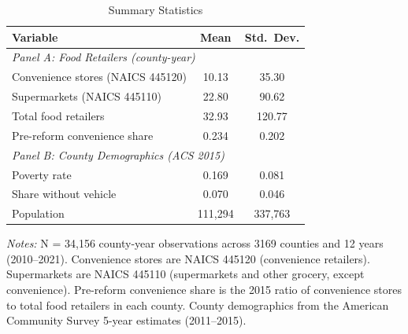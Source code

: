 
\begin{table}[H]
\centering
\caption{Summary Statistics}
\label{tab:summary}
\begin{threeparttable}
\begin{tabular}{lcc}
\toprule
Variable & Mean & Std.\ Dev. \\
\midrule
\multicolumn{3}{l}{\textit{Panel A: Food Retailers (county-year)}} \\[2pt]
Convenience stores (NAICS 445120) & 10.13 & 35.30 \\
Supermarkets (NAICS 445110) & 22.80 & 90.62 \\
Total food retailers & 32.93 & 120.77 \\
Pre-reform convenience share & 0.234 & 0.202 \\[4pt]
\multicolumn{3}{l}{\textit{Panel B: County Demographics (ACS 2015)}} \\[2pt]
Poverty rate & 0.169 & 0.081 \\
Share without vehicle & 0.070 & 0.046 \\
Population & 111,294 & 337,763 \\
\bottomrule
\end{tabular}
\begin{tablenotes}[flushleft]
\small
\item \textit{Notes:} N = 34,156 county-year observations across 3169 counties and 12 years (2010--2021). Convenience stores are NAICS 445120 (convenience retailers). Supermarkets are NAICS 445110 (supermarkets and other grocery, except convenience). Pre-reform convenience share is the 2015 ratio of convenience stores to total food retailers in each county. County demographics from the American Community Survey 5-year estimates (2011--2015).
\end{tablenotes}
\end{threeparttable}
\end{table}

